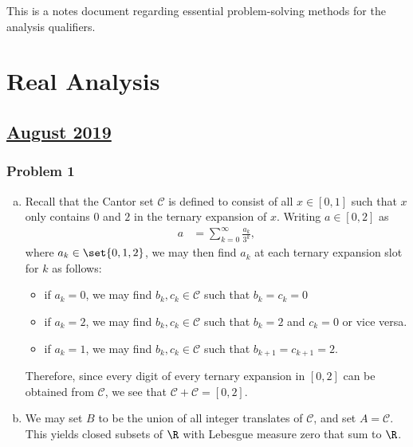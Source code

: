\documentclass[10pt]{mypackage}
\begin{document}
\RaggedRight
This is a notes document regarding essential problem-solving methods for the analysis qualifiers.
\section{Real Analysis}%
\subsection{\href{https://math.virginia.edu/graduate/exams/analysis/2019Aug_real.pdf}{August 2019}}%
\subsubsection{Problem 1}%
\begin{enumerate}[(a)]
  \item Recall that the Cantor set $\mathcal{C}$ is defined to consist of all $x\in [0,1]$ such that $x$ only contains $0$ and $2$ in the ternary expansion of $x$. Writing $a\in [0,2]$ as
    \begin{align*}
      a &= \sum_{k=0}^{\infty}\frac{a_k}{3^{k}},
    \end{align*}
    where $a_k\in\set{0,1,2}$, we may then find $a_k$ at each ternary expansion slot for $k$ as follows:
    \begin{itemize}
      \item if $a_k = 0$, we may find $b_k,c_k\in \mathcal{C}$ such that $b_k = c_k = 0$
      \item if $a_k = 2$, we may find $b_k,c_k\in \mathcal{C}$ such that $b_k = 2$ and $c_k = 0$ or vice versa.
      \item if $a_k = 1$, we may find $b_k,c_k\in \mathcal{C}$ such that $b_{k+1} = c_{k+1} = 2$.
    \end{itemize}
    Therefore, since every digit of every ternary expansion in $[0,2]$ can be obtained from $\mathcal{C}$, we see that $\mathcal{C} + \mathcal{C} = [0,2]$.
  \item We may set $B$ to be the union of all integer translates of $\mathcal{C}$, and set $A = \mathcal{C}$. This yields closed subsets of $\R$ with Lebesgue measure zero that sum to $\R$.
\end{enumerate}
\end{document}
